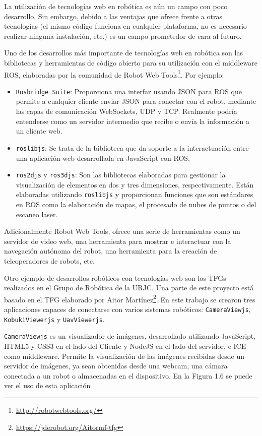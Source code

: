 La utilización de tecnologías web en robótica es aún un campo con poco desarrollo. Sin embargo, debido a las ventajas que ofrece frente a otras tecnologías (el mismo código funciona en cualquier plataforma, no es necesario realizar ninguna instalación, etc.) es un campo prometedor de cara al futuro.

Uno de los desarrollos más importante de tecnologías web en robótica son las bibliotecas y herramientas de código abierto para su utilización con el middleware ROS, elaboradas por la comunidad de Robot Web Tools\footnote{\url{http://robotwebtools.org/}}. Por ejemplo:
\begin{itemize}
	\item \texttt{Rosbridge Suite}: Proporciona una interfaz usando JSON para ROS que permite a cualquier cliente enviar JSON para conectar con el robot, mediante las capas de comunicación WebSockets, UDP y TCP. Realmente podría entenderse como un servidor intermedio que recibe o envía la información a un cliente web.
	\item \texttt{roslibjs}: Se trata de la biblioteca que da soporte a la interactuación entre una aplicación web desarrollada en JavaScript con ROS. 
	\item \texttt{ros2djs} y \texttt{ros3djs}: Son las bibliotecas elaboradas para gestionar la visualización de elementos en dos y tres dimensiones, respectivamente. Están elaboradas utilizando \texttt{roslibjs} y proporcionan funciones que son estándares en ROS como la elaboración de mapas, el procesado de nubes de puntos o del escaneo laser.
\end{itemize}

Adicionalmente Robot Web Tools, ofrece una serie de herramientas como un servidor de video web, una herramienta para mostrar e interactuar con la navegación autónoma del robot, una herramienta para la creación de teleoperadores de robots, etc.

Otro ejemplo de desarrollos robóticos con tecnologías web son los TFGs realizados en el Grupo de Robótica de la URJC. Una parte de este proyecto está basado en el TFG elaborado por Aitor Martínez\footnote{\url{https://jderobot.org/Aitormf-tfg}}. En este trabajo se crearon tres aplicaciones capaces de conectarse con varios sistemas robóticos: \texttt{CameraViewjs}, \texttt{KobukiViewerjs} y \texttt{UavViewerjs}.

\texttt{CameraViewjs} es un visualizador de imágenes, desarrollado utilizando JavaScript, HTML5 y CSS3 en el lado del Cliente y NodeJS en el lado del servidor, e ICE como middleware. Permite la visualización de las imágenes recibidas desde un servidor de imágenes, ya sean obtenidas desde una webcam, una cámara conectada a un robot o almacenadas en el dispositivo. En la Figura 1.6 se puede ver el uso de esta aplicación

